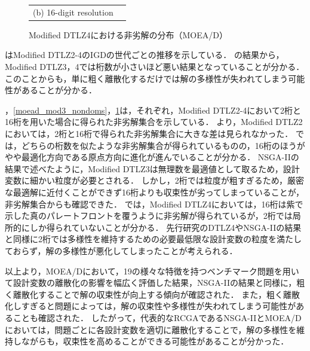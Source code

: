 \documentclass[../main/main]{subfiles}
\begin{document}
\begin{figure}[htbp]
\begin{tabular}{cc}
\begin{minipage}{0.32\hsize}
\centering
{\footnotesize (b) 16-digit resolution}
\caption{Modified DTLZ4における非劣解の分布（MOEA/D）}
\label{moead_mod4_nondoms}
\end{minipage}
\end{tabular}
\end{figure}

\afterpage{\clearpage}

はModified DTLZ2-4のIGDの世代ごとの推移を示している．
の結果から，Modified DTLZ3，4では桁数が小さいほど悪い結果となっていることが分かる．
このことからも，単に粗く離散化するだけでは解の多様性が失われてしまう可能性があることが分かる．

，\ref{moead_mod3_nondoms}，\ref{moead_mod4_nondoms}は，それぞれ，Modified DTLZ2-4において2桁と16桁を用いた場合に得られた非劣解集合を示している．
より，Modified DTLZ2においては，2桁と16桁で得られた非劣解集合に大きな差は見られなかった．
では，どちらの桁数を似たような非劣解集合が得られているものの，16桁のほうがやや最適化方向である原点方向に進化が進んでいることが分かる．
NSGA-IIの結果で述べたように，Modified DTLZ3は無理数を最適値として取るため，設計変数に細かい粒度が必要とされる．
しかし，2桁では粒度が粗すぎるため，厳密な最適解に近付くことができず16桁よりも収束性が劣ってしまっていることが，非劣解集合からも確認できた．
では，Modified DTLZ4においては，16桁は紫で示した真のパレートフロントを覆うように非劣解が得られているが，2桁では局所的にしか得られていないことが分かる．
先行研究のDTLZ4やNSGA-IIの結果と同様に2桁では多様性を維持するための必要最低限な設計変数の粒度を満たしておらず，解の多様性が悪化してしまったことが考えられる．

以上より，MOEA/Dにおいて，19の様々な特徴を持つベンチマーク問題を用いて設計変数の離散化の影響を幅広く評価した結果，NSGA-IIの結果と同様に，粗く離散化することで解の収束性が向上する傾向が確認された．
また，粗く離散化しすぎると問題によっては，解の収束性や多様性が失われてしまう可能性があることも確認された．
したがって，代表的なRCGAであるNSGA-IIとMOEA/Dにおいては，問題ごとに各設計変数を適切に離散化することで，解の多様性を維持しながらも，収束性を高めることができる可能性があることが分かった．
%
%
%
\end{document}

